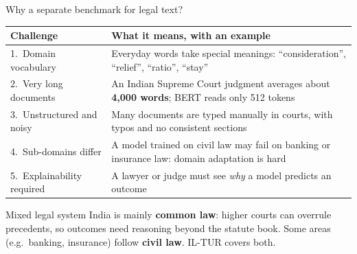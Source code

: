 \documentclass[aspectratio=169,11pt]{beamer}
\begin{document}
\begin{frame}{Why a separate benchmark for legal text?}
  \small
  \begin{tabularx}{\textwidth}{@{}lX@{}}
    \toprule
    Challenge & What it means, with an example\\
    \midrule
    1.\ Domain vocabulary & Everyday words take special meanings: ``consideration'', ``relief'', ``ratio'', ``stay''\\
    2.\ Very long documents & An Indian Supreme Court judgment averages about \textbf{4,000 words}; BERT reads only 512 tokens\\
    3.\ Unstructured and noisy & Many documents are typed manually in courts, with typos and no consistent sections\\
    4.\ Sub-domains differ & A model trained on civil law may fail on banking or insurance law: domain adaptation is hard\\
    5.\ Explainability required & A lawyer or judge must see \emph{why} a model predicts an outcome\\
    \bottomrule
  \end{tabularx}
  \vspace{2mm}
  \begin{exampleblock}{Mixed legal system}
    \small
    India is mainly \textbf{common law}: higher courts can overrule precedents, so outcomes need reasoning beyond the statute book. Some areas (e.g.\ banking, insurance) follow \textbf{civil law}. IL-TUR covers both.
  \end{exampleblock}
\end{frame}
\end{document}

